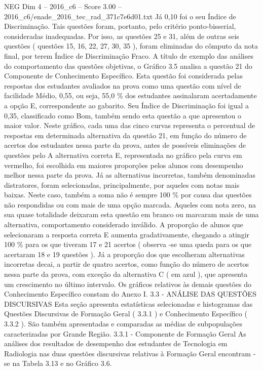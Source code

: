 \begin{textsample}{NEG Dim 4 – 2016\_c6 – Score 3.00 – 2016\_c6/enade\_2016\_tec\_rad\_371c7e6d01.txt}
Já 0,10 foi o seu Índice de Discriminação.
Tais questões foram, portanto, pelo critério ponto-bisserial, consideradas inadequadas.
Por isso, as questões 25 e 31, além de outras seis questões ( questões 15, 16, 22, 27, 30, 35 ), foram eliminadas do cômputo da nota final, por terem Índice de Discriminação Fraco.
A título de exemplo das análises do comportamento das questões objetivas, o Gráfico 3.5 analisa a questão 21 do Componente de Conhecimento Específico.
Esta questão foi considerada pelas respostas dos estudantes avaliados na prova como uma questão com nível de facilidade Médio, 0,55, ou seja, 55,0 \% dos estudantes assinalaram acertadamente a opção E, correspondente ao gabarito.
Seu Índice de Discriminação foi igual a 0,35, classificado como Bom, também sendo esta questão a que apresentou o maior valor.
Neste gráfico, cada uma das cinco curvas representa o percentual de respostas em determinada alternativa da questão 21, em função do número de acertos dos estudantes nessa parte da prova, antes de possíveis eliminações de questões pelo A alternativa correta E, representada no gráfico pela curva em vermelho, foi escolhida em maiores proporções pelos alunos com desempenho melhor nessa parte da prova.
Já as alternativas incorretas, também denominadas distratores, foram selecionadas, principalmente, por aqueles com notas mais baixas.
Neste caso, também a soma não é sempre 100 \% por causa das questões não respondidas ou com mais de uma opção marcada.
Aqueles com nota zero, na sua quase totalidade deixaram esta questão em branco ou marcaram mais de uma alternativa, comportamento considerado inválido.
A proporção de alunos que selecionaram a resposta correta E aumenta gradativamente, chegando a atingir 100 \% para os que tiveram 17 e 21 acertos ( observa -se uma queda para os que acertaram 18 e 19 questões ).
Já a proporção dos que escolheram alternativas incorretas decai, a partir de quatro acertos, como função do número de acertos nessa parte da prova, com exceção da alternativa C ( em azul ), que apresenta um crescimento no último intervalo.
Os gráficos relativos às demais questões do Conhecimento Específico constam do Anexo I. 3.3 - ANÁLISE DAS QUESTÕES DISCURSIVAS Esta seção apresenta estatísticas selecionadas e histogramas das Questões Discursivas de Formação Geral ( 3.3.1 ) e Conhecimento Específico ( 3.3.2 ).
São também apresentadas e comparadas as médias de subpopulações caracterizadas por Grande Região. 3.3.1 - Componente de Formação Geral As análises dos resultados de desempenho dos estudantes de Tecnologia em Radiologia nas duas questões discursivas relativas à Formação Geral encontram -se na Tabela 3.13 e no Gráfico 3.6.

\end{textsample}
